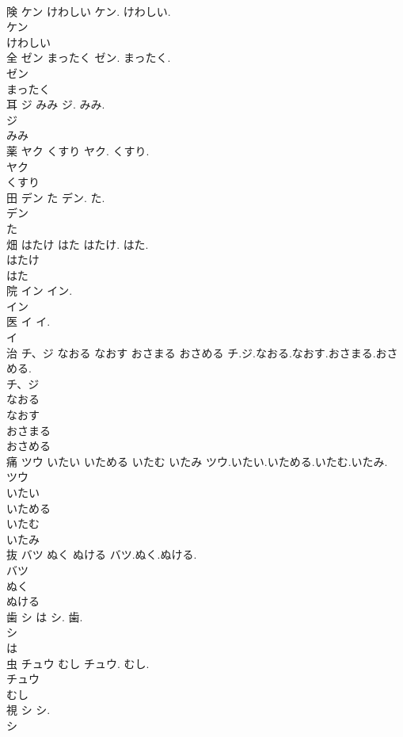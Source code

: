 \documentclass[8pt]{extreport}
\begin{document}
\begin{CJK}{UTF8}{min}
\\	険	ケン けわしい	ケン. けわしい.	
\\	ケン
\\	けわしい
\\	全	ゼン まったく	ゼン. まったく.	
\\	ゼン
\\	まったく
\\	耳	ジ みみ	ジ. みみ.	
\\	ジ
\\	みみ
\\	薬	ヤク くすり	ヤク. くすり.	
\\	ヤク
\\	くすり
\\	田	デン た	デン. た.	
\\	デン
\\	た
\\	畑	はたけ はた	はたけ. はた.	
\\	はたけ
\\	はた
\\	院	イン	イン.	
\\	イン
\\	医	イ	イ.	
\\	イ
\\	治	チ、ジ なおる なおす おさまる おさめる	チ.ジ.なおる.なおす.おさまる.おさめる.	
\\	チ、ジ
\\	なおる
\\	なおす
\\	おさまる
\\	おさめる
\\	痛	ツウ いたい いためる いたむ いたみ	ツウ.いたい.いためる.いたむ.いたみ.	
\\	ツウ
\\	いたい
\\	いためる
\\	いたむ
\\	いたみ
\\	抜	バツ ぬく ぬける	バツ.ぬく.ぬける.	
\\	バツ
\\	ぬく
\\	ぬける
\\	歯	シ は	シ. 歯.	
\\	シ
\\	は
\\	虫	チュウ むし	チュウ. むし.	
\\	チュウ
\\	むし
\\	視	シ	シ.	
\\	シ

\end{CJK}
\end{document}

